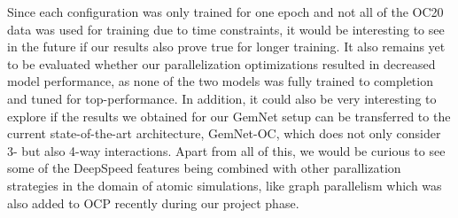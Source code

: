 Since each configuration was only trained for one epoch and not all of the OC20 data was 
used for training due to time constraints, it would be interesting to see in the future if our results 
also prove true for longer training. It also remains yet to be evaluated whether our
parallelization optimizations resulted in decreased model performance, as none of the two 
models was fully trained to completion and tuned for top-performance.
In addition, it could also be very interesting to explore if the results we obtained for our GemNet setup
can be transferred to the current state-of-the-art architecture, GemNet-OC, which does not only
consider 3- but also 4-way interactions.
Apart from all of this, we would be curious to see some of the DeepSpeed features being
combined with other parallization strategies in the domain of atomic simulations, like 
graph parallelism \cite{https://doi.org/10.48550/arxiv.2203.09697} which was also added to
OCP recently during our project phase.

